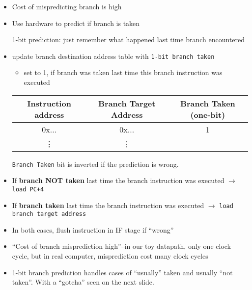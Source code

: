 \begin{frame}[fragile]
\begin{itemize}
  \item Cost of mispredicting branch is high
  \item Use hardware to predict if branch is taken

    1-bit prediction: just remember what happened last time branch encountered
  \item update branch destination address table with {\tt 1-bit branch taken}
    \begin{itemize}
    \item set to 1, if branch was taken last time this branch instruction was executed 
    \end{itemize}

    \begin{center}
    {\tiny
	\begin{tabular}{c|c|c}
Instruction address & Branch Target Address &  Branch Taken (one-bit) \\\hline
0x...              & 0x... & 1 \\
\vdots & \vdots \\
\end{tabular}}
\end{center}
{\footnotesize {\tt Branch Taken} bit is inverted if the prediction is wrong.}
  \item If \textbf{branch NOT taken} last time the branch instruction was executed
$\rightarrow$    \texttt{load PC+4}
  \item If \textbf{branch taken} last time the branch instruction was executed
$\rightarrow$  \texttt{load branch target address}
\item In both cases, flush instruction in IF stage if ``wrong''
  \end{itemize}
  \BNotes\ifnum{}
  \begin{itemize}
  \item ``Cost of branch misprediction high''--in our toy datapath, only one clock cycle, but in real computer, misprediction cost many clock cycles
  \item 1-bit branch prediction handles cases of ``usually'' taken and
    usually ``not taken''.  With a ``gotcha'' seen on the next slide.
\end{itemize}
\fi\ENotes
\end{frame}

